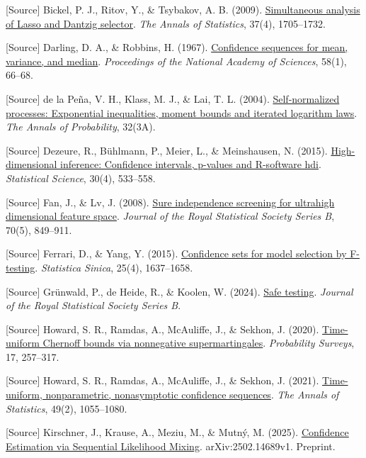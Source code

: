 \documentclass[
  english,
  11pt,
  a4paper,
]{article}
\begin{document}
{[}Source{]} Bickel, P. J., Ritov, Y., \& Tsybakov, A. B. (2009).
\href{https://doi.org/10.1214/08-AOS620}{Simultaneous analysis of Lasso
and Dantzig selector}. \emph{The Annals of Statistics}, 37(4),
1705--1732.

{[}Source{]} Darling, D. A., \& Robbins, H. (1967).
\href{https://doi.org/10.1073/pnas.58.1.66}{Confidence sequences for
mean, variance, and median}. \emph{Proceedings of the National Academy
of Sciences}, 58(1), 66--68.

{[}Source{]} de la Peña, V. H., Klass, M. J., \& Lai, T. L. (2004).
\href{https://doi.org/10.1214/009117904000000397}{Self-normalized
processes: Exponential inequalities, moment bounds and iterated
logarithm laws}. \emph{The Annals of Probability}, 32(3A).

{[}Source{]} Dezeure, R., Bühlmann, P., Meier, L., \& Meinshausen, N.
(2015). \href{https://doi.org/10.1214/15-STS527}{High-dimensional
inference: Confidence intervals, p-values and R-software hdi}.
\emph{Statistical Science}, 30(4), 533--558.

{[}Source{]} Fan, J., \& Lv, J. (2008).
\href{https://doi.org/10.1111/j.1467-9868.2008.00674.x}{Sure
independence screening for ultrahigh dimensional feature space}.
\emph{Journal of the Royal Statistical Society Series B}, 70(5),
849--911.

{[}Source{]} Ferrari, D., \& Yang, Y. (2015).
\href{https://doi.org/10.5705/ss.2014.110}{Confidence sets for model
selection by F-testing}. \emph{Statistica Sinica}, 25(4), 1637--1658.

{[}Source{]} Grünwald, P., de Heide, R., \& Koolen, W. (2024).
\href{https://doi.org/10.1093/jrsssb/qkae011}{Safe testing}.
\emph{Journal of the Royal Statistical Society Series B}.

{[}Source{]} Howard, S. R., Ramdas, A., McAuliffe, J., \& Sekhon, J.
(2020). \href{https://doi.org/10.1214/18-PS321}{Time-uniform Chernoff
bounds via nonnegative supermartingales}. \emph{Probability Surveys},
17, 257--317.

{[}Source{]} Howard, S. R., Ramdas, A., McAuliffe, J., \& Sekhon, J.
(2021). \href{https://doi.org/10.1214/20-AOS1991}{Time-uniform,
nonparametric, nonasymptotic confidence sequences}. \emph{The Annals of
Statistics}, 49(2), 1055--1080.

{[}Source{]} Kirschner, J., Krause, A., Meziu, M., \& Mutný, M. (2025).
\href{https://arxiv.org/abs/2502.14689}{Confidence Estimation via
Sequential Likelihood Mixing}. arXiv:2502.14689v1. Preprint.
\end{document}
